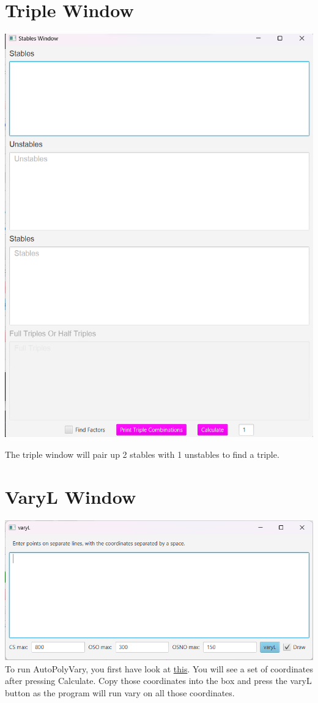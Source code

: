 \documentclass[11pt]{report}
\begin{document}
\section{Triple Window}\label{triwin}
\includegraphics[scale=0.6]{triple_windows}

The triple window will pair up 2 stables with 1 unstables to find a triple.
\section{VaryL Window}\label{varyL}
\includegraphics[scale=0.75]{varyL}
To run AutoPolyVary, you first have look at \hyperref[covers]{this}. 
You will see a set of coordinates after pressing Calculate. 
Copy those coordinates into the box and press the varyL button as the program will run vary on all those coordinates.
\end{document}
